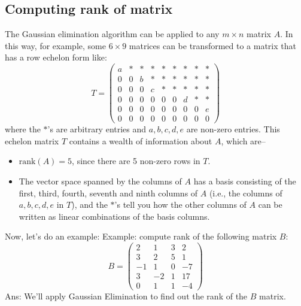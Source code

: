 \documentclass[conference,final,11pt,technote,onecolumn]{IEEEtran}\usepackage[]{graphicx}\usepackage[]{color}
\begin{document}
\subsection{Computing rank of matrix}
\label{term:gauss_jordan_elimination_algorithm_compute_rank}
The Gaussian elimination algorithm can be applied to any $m\times n$ matrix $A$. In this way, for example, some $6\times 9$ matrices can be transformed to a matrix that has a row echelon form like:
\[ 
T = \begin{pmatrix}
a & * & * & * & * & * & * & * & *\\
0 & 0 & b & * & * & * & * & * & *\\
0 & 0 & 0 & c & * & * & * & * & *\\
0 & 0 & 0 & 0 & 0 & 0 & d & * & *\\
0 & 0 & 0 & 0 & 0 & 0 & 0 & 0 & e\\
0 & 0 & 0 & 0 & 0 & 0 & 0 & 0 & 0
\end{pmatrix}
\]
where the $*$'s are arbitrary entries and $a,b,c,d,e$ are non-zero entries. This echelon matrix $T$ contains a wealth of information about $A$, which are--
\begin{itemize}
	\item $\text{rank}(A) = 5$, since there are 5 non-zero rows in $T$.
	\item The vector space spanned by the columns of $A$ has a basis consisting of the first, third, fourth, seventh and ninth columns of $A$ (i.e., the columns of $a,b,c,d,e$ in $T$), and the $*$'s tell you how the other columns of $A$ can be written as linear combinations of the basis columns.
\end{itemize}
Now, let's do an example:
Example: compute rank of the following matrix $B$:
\[ 
B = \begin{pmatrix}
2 & 1 & 3 & 2\\
3 & 2 & 5 & 1\\
-1 & 1 & 0 & -7\\
3 & -2 & 1 & 17\\
0 & 1 & 1 & -4
\end{pmatrix}
\]
Ans: We'll apply Gaussian Elimination to find out the rank of the $B$ matrix.
\end{document}
